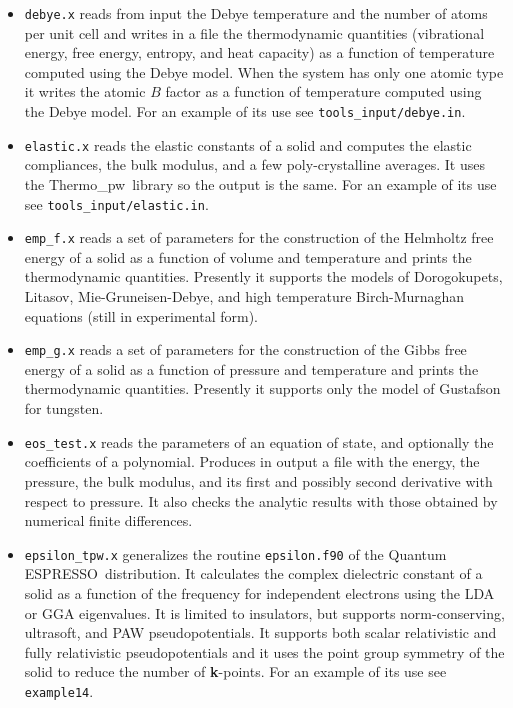 \documentclass[12pt,a4paper,twoside]{report}
\def\qe{{\sc Quantum ESPRESSO}}
\def\thermo{{\sc Thermo}\_{\sc pw}}
\begin{document}
\begin{itemize}
\item \texttt{debye.x} reads from input the Debye temperature and the
number of atoms per unit cell and writes in a file the thermodynamic
quantities (vibrational energy, free energy, entropy, and heat capacity) as
a function of temperature computed using the Debye model. When the
system has only one atomic type it writes the atomic $B$ factor
as a function of temperature computed using the Debye model.
For an example of its use see \texttt{tools\_input/debye.in}.

\item \texttt{elastic.x} reads the elastic constants of a
solid and computes the elastic compliances, the bulk modulus, and a few
poly-crystalline averages. It uses the \thermo\ library so the output is the
same. 
For an example of its use see \texttt{tools\_input/elastic.in}.

\item \texttt{emp\_f.x} reads a set of parameters for the construction of
the Helmholtz free energy of a solid as a function of volume and 
temperature and prints the thermodynamic quantities. Presently it 
supports the models of Dorogokupets, Litasov, Mie-Gruneisen-Debye, 
and high temperature Birch-Murnaghan equations (still in experimental form).

\item \texttt{emp\_g.x} reads a set of parameters for the construction of
the Gibbs free energy of a solid as a function of pressure and temperature and
prints the thermodynamic quantities. Presently it supports only the model
of Gustafson for tungsten.

\item \texttt{eos\_test.x} reads the parameters of an equation of state,
and optionally the coefficients of a polynomial. Produces in output
a file with the energy, the pressure, the bulk modulus, and its first
and possibly second derivative with respect to pressure.
It also checks the analytic results with those obtained by numerical
finite differences.

\item \texttt{epsilon\_tpw.x} generalizes the routine
\texttt{epsilon.f90} of the \qe\ distribution. It calculates the 
complex dielectric
constant of a solid as a function of the frequency for independent electrons
using the LDA or GGA eigenvalues. It is limited to insulators, but supports
norm-conserving, ultrasoft, and PAW pseudopotentials. It supports both scalar
relativistic and fully relativistic pseudopotentials and it uses the point
group symmetry of the solid to reduce the number of {\bf k}-points.
For an example of its use see \texttt{example14}.


\end{itemize}
\end{document}
